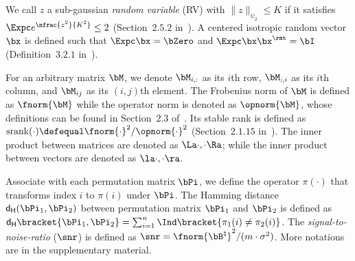 \documentclass[11pt]{article}
\def \dH {\mathsf{d_H}}
\def \bBtrue {\bB^{\natural}}
\def\srank#1{\textup{srank}(#1)}
\begin{document}
We call  $z$ a
sub-gaussian \emph{random variable} (RV) with $\|z\|_{\psi_2} \leq K$
if it satisfies
$\Expc e^{\nfrac{z^2}{K^2}} \leq 2$
 (Section~$2.5.2$ in~\citet{vershynin2018high}).
A centered isotropic random vector $\bx$ is
defined such that $\Expc \bx = \bZero$ and
$\Expc \bx\bx^{\rmt}= \bI$ (Definition~$3.2.1$ in~\citet{vershynin2018high}).


For an arbitrary matrix $\bM$,
we denote
$\bM_{i, :}$ as its $i$th row,
$\bM_{: , i}$ as its $i$th column, and
$\bM_{ij}$ as its $(i,j)$th element.
The Frobenius norm of $\bM$ is defined as
$\fnorm{\bM}$ while the operator
norm is denoted as $\opnorm{\bM}$, whose definitions can be found
in  Section~$2.3$ of~\citet{golub2012matrix}.
Its stable rank
is defined as $\srank{\cdot} \defequal \fnorm{\cdot}^2/\opnorm{\cdot}^2$
(Section~$2.1.15$ in~\citet{tropp2015introduction}).
The inner product between matrices are
denoted as $\La \cdot, \cdot\Ra$; while the inner product
between vectors are denoted as $\la \cdot, \cdot \ra$.

Associate with each permutation matrix $\bPi$, we define
the operator $\pi(\cdot)$ that transforms index $i$
to $\pi(i)$ under $\bPi$.
The Hamming distance
$\dH(\bPi_1, \bPi_2)$ between permutation matrix
$\bPi_1$ and $\bPi_2$ is defined as
$\dH\bracket{\bPi_1, \bPi_2} = \sum_{i=1}^n \Ind\bracket{\pi_1(i) \neq \pi_2(i)}$.
The \emph{signal-to-noise-ratio} ($\snr$) is defined as
$\snr = \fnorm{\bBtrue}^2/(m\cdot \sigma^2)$.
More notations are in the supplementary material.
\end{document}
